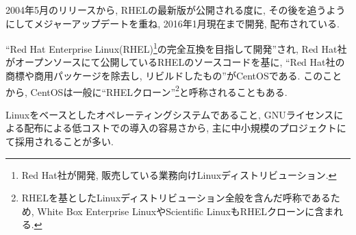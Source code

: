 2004年5月のリリースから, RHELの最新版が公開される度に, その後を追うようにしてメジャーアップデートを重ね, 2016年1月現在まで開発, 配布されている.

“Red Hat Enterprise Linux(RHEL)\footnote{Red Hat社が開発, 販売している業務向けLinuxディストリビューション.}の完全互換を目指して開発”され, Red Hat社がオープンソースにて公開しているRHELのソースコードを基に, “Red Hat社の商標や商用パッケージを除去し, リビルドしたもの”がCentOSである.
このことから, CentOSは一般に“RHELクローン”\footnote{RHELを基としたLinuxディストリビューション全般を含んだ呼称であるため, White Box Enterprise LinuxやScientific LinuxもRHELクローンに含まれる.}と呼称されることもある.

Linuxをベースとしたオペレーティングシステムであること, GNUライセンスによる配布による低コストでの導入の容易さから, 主に中小規模のプロジェクトにて採用されることが多い.
